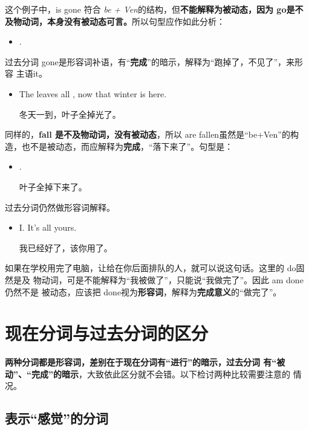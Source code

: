 这个例子中，is gone 符合 \emph{be + Ven}的结构，但\textbf{不能解释为被动态，因为 go是不
  及物动词，本身没有被动态可言。}所以句型应作如此分析：

\begin{itemize}
\item  {}  .
\end{itemize}

过去分词 gone是形容词补语，有“\textbf{完成}”的暗示，解释为“跑掉了，不见了”，来形容
主语it。

\begin{itemize}
\item  The leaves  all , now that winter is here.

  冬天一到，叶子全掉光了。
\end{itemize}

同样的，\textbf{fall 是不及物动词，没有被动态}，所以 are fallen虽然是“be+Ven”的构
造，也不是被动态，而应解释为\textbf{完成}，“落下来了”。句型是：

\begin{itemize}
\item {}  .

叶子全掉下来了。
\end{itemize}

过去分词仍然做形容词解释。
\begin{itemize}
\item  I. It's all yours.

我已经好了，该你用了。
\end{itemize}

如果在学校用完了电脑，让给在你后面排队的人，就可以说这句话。这里的 do固然是及
物动词，可是不能解释为“我被做了”，只能说“我做完了”。因此 am done 仍然不是
被动态，应该把 done视为\textbf{形容词}，解释为\textbf{完成意义}的“做完了”。

\section{现在分词与过去分词的区分}

\textbf{两种分词都是形容词，差别在于现在分词有“进行”的暗示，过去分词
  有“被动”、“完成”的暗示}，大致依此区分就不会错。以下检讨两种比较需要注意的
情况。

\subsection{表示“感觉”的分词}


